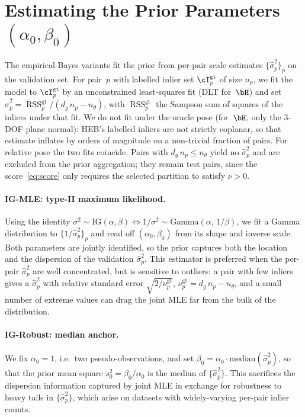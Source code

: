 \documentclass{article}
\DeclareMathOperator{\RSS}{RSS}
\newcommand{\IG}{\mathrm{IG}}
\newcommand{\mname}[1]{\texorpdfstring{#1\xspace}{#1}}
\newcommand{\igmle}{\mname{IG-MLE}}
\newcommand{\igrobust}{\mname{IG-Robust}}
\newcommand{\heb}{\mname{HEB}}
\begin{document}
\section{Estimating the Prior Parameters \texorpdfstring{$(\alpha_0, \beta_0)$}{(alpha0, beta0)}}
\label{sec:supp-prior-estimation}

The empirical-Bayes variants fit the prior from per-pair scale
estimates $\{\hat\sigma^2_p\}_p$ on the validation set.  For pair~$p$
with labelled inlier set $\cI_p^{\mathrm{gt}}$ of size
$n_p$, we fit the model to $\cI_p^{\mathrm{gt}}$ by an
unconstrained least-squares fit (DLT for~$\bH$) and set
$\hat\sigma^2_p = \RSS_p^{\mathrm{gt}} / (d_g\,n_p - n_\theta)$, with
$\RSS_p^{\mathrm{gt}}$ the Sampson sum of squares of the inliers under that fit.
We do not fit under the oracle pose (for~$\bH$, only the 3-DOF plane
normal): \heb's labelled inliers are not strictly coplanar, so that
estimate inflates by orders of magnitude on a non-trivial fraction of
pairs.  For relative pose the two fits coincide.  Pairs with $d_g\,n_p \le n_\theta$ yield no
$\hat\sigma^2_p$ and are excluded from the prior aggregation; they
remain test pairs, since the score~\eqref{eq:score} only requires the
selected partition to satisfy $\nu > 0$.

\paragraph{\igmle: type-II maximum likelihood.}  Using the identity
$\sigma^2 \!\sim\! \IG(\alpha,\beta) \iff
	1/\sigma^2 \!\sim\! \mathrm{Gamma}(\alpha,\,1/\beta)$,
we fit a Gamma distribution to $\{1/\hat\sigma^2_p\}_p$ and
read off $(\alpha_0, \beta_0)$ from its shape and inverse
scale.  Both parameters are jointly identified, so the prior
captures both the location and the dispersion of the
validation $\hat\sigma^2_p$.  This estimator is preferred when
the per-pair $\hat\sigma^2_p$ are well concentrated, but is
sensitive to outliers: a pair with few inliers gives a
$\hat\sigma^2_p$ with relative standard error $\sqrt{2/\nu_p^{\mathrm{gt}}}$,
$\nu_p^{\mathrm{gt}} = d_g\,n_p - n_\theta$, and a small number of extreme values can drag
the joint MLE far from the bulk of the distribution.

\paragraph{\igrobust: median anchor.}  We fix $\alpha_0 = 1$, i.e.\
two pseudo-observations, and set
$\beta_0 = \alpha_0 \cdot \mathrm{median}(\hat\sigma^2_p)$, so that the
prior mean square $s_0^2 = \beta_0/\alpha_0$ is the median of
$\{\hat\sigma^2_p\}$.  This sacrifices the
dispersion information captured by joint MLE in exchange for
robustness to heavy tails in $\{\hat\sigma^2_p\}$, which arise
on datasets with widely-varying per-pair inlier counts.
\end{document}

